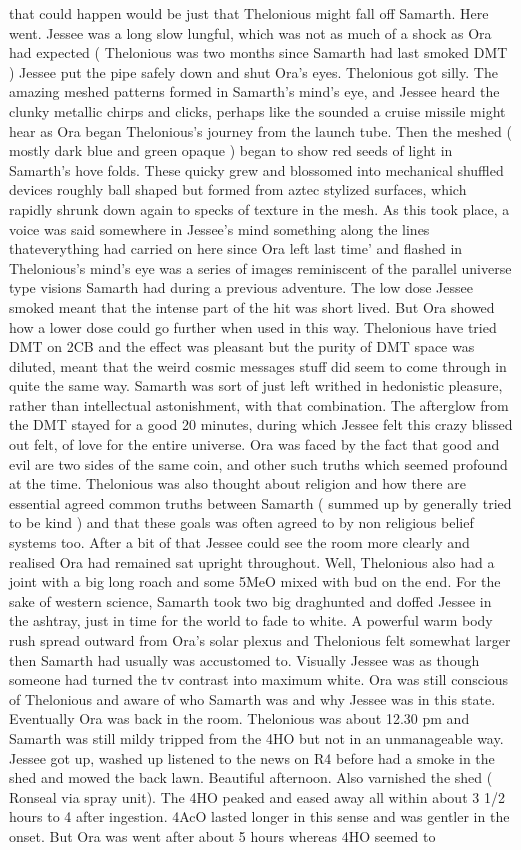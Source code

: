 \documentclass[12pt]{book}
\begin{document}
that could happen would be just that Thelonious might fall off Samarth. Here went. Jessee was a long slow lungful, which was not as much of a shock as Ora had expected ( Thelonious was two months since Samarth had last smoked DMT ) Jessee put the pipe safely down and shut Ora's eyes. Thelonious got silly. The amazing meshed patterns formed in Samarth's mind's eye, and Jessee heard the clunky metallic chirps and clicks, perhaps like the sounded a cruise missile might hear as Ora began Thelonious's journey from the launch tube. Then the meshed ( mostly dark blue and green opaque ) began to show red seeds of light in Samarth's hove folds. These quicky grew and blossomed into mechanical shuffled devices roughly ball shaped but formed from aztec stylized surfaces, which rapidly shrunk down again to specks of texture in the mesh. As this took place, a voice was said somewhere in Jessee's mind something along the lines thateverything had carried on here since Ora left last time' and flashed in Thelonious's mind's eye was a series of images reminiscent of the parallel universe type visions Samarth had during a previous adventure. The low dose Jessee smoked meant that the intense part of the hit was short lived. But Ora showed how a lower dose could go further when used in this way. Thelonious have tried DMT on 2CB and the effect was pleasant but the purity of DMT space was diluted, meant that the weird cosmic messages stuff did seem to come through in quite the same way. Samarth was sort of just left writhed in hedonistic pleasure, rather than intellectual astonishment, with that combination. The afterglow from the DMT stayed for a good 20 minutes, during which Jessee felt this crazy blissed out felt, of love for the entire universe. Ora was faced by the fact that good and evil are two sides of the same coin, and other such truths which seemed profound at the time. Thelonious was also thought about religion and how there are essential agreed common truths between Samarth ( summed up by generally tried to be kind ) and that these goals was often agreed to by non religious belief systems too. After a bit of that Jessee could see the room more clearly and realised Ora had remained sat upright throughout. Well, Thelonious also had a joint with a big long roach and some 5MeO mixed with bud on the end. For the sake of western science, Samarth took two big draghunted and doffed Jessee in the ashtray, just in time for the world to fade to white. A powerful warm body rush spread outward from Ora's solar plexus and Thelonious felt somewhat larger then Samarth had usually was accustomed to. Visually Jessee was as though someone had turned the tv contrast into maximum white. Ora was still conscious of Thelonious and aware of who Samarth was and why Jessee was in this state. Eventually Ora was back in the room. Thelonious was about 12.30 pm and Samarth was still mildy tripped from the 4HO but not in an unmanageable way. Jessee got up, washed up listened to the news on R4 before had a smoke in the shed and mowed the back lawn. Beautiful afternoon. Also varnished the shed ( Ronseal via spray unit). The 4HO peaked and eased away all within about 3 1/2 hours to 4 after ingestion. 4AcO lasted longer in this sense and was gentler in the onset. But Ora was went after about 5 hours whereas 4HO seemed to 
\end{document}
